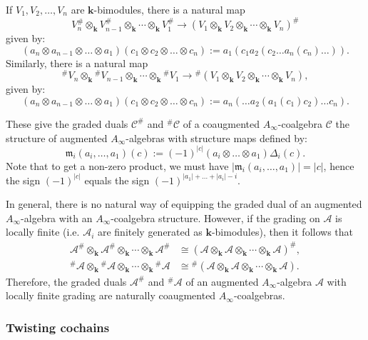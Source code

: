 \documentclass{gtpart}
\renewcommand{\k}{\mathbf{k}}
\newcommand{\m}{\mathfrak{m}}
\newcommand{\A}{\mathscr{A}}
\renewcommand{\C}{\mathscr{C}}
\begin{document}
If $V_1,V_2,\ldots, V_n$ are $\k$-bimodules, there is a natural map 
\[V_n^\# \otimes_\k  V_{n-1}^\# \otimes_\k \cdots \otimes_\k V_1^\# \to (V_1 \otimes_\k V_2 \otimes_\k \cdots \otimes_\k V_n)^\# \]
given  by:
\begin{equation}\label{composition} 
(a_n \otimes a_{n-1} \otimes \ldots \otimes a_1) (c_1 \otimes c_2 \otimes \ldots\otimes c_n ) :=
    a_1(c_1 a_2(c_2 \ldots a_n(c_n) \ldots)).  
\end{equation}
Similarly, there is a natural map 
\[^\# V_n \otimes_\k\!^\# V_{n-1} \otimes_\k \cdots \otimes_\k \!^\# V_1 \to \!^\#(V_1 \otimes_\k V_2
\otimes_\k \cdots \otimes_\k V_n), \]
given  by:
\begin{equation}\label{composition2} 
    (a_n \otimes a_{n-1} \otimes \ldots \otimes a_1) (c_1 \otimes c_2 \otimes \ldots\otimes c_n ) := a_n (\ldots a_2(a_1(c_1)c_2)\ldots c_n).  
\end{equation}

These give the graded duals $\C^\#$ and $\!^\#\C$ of a coaugmented $A_\infty$-coalgebra $\C$ the structure of augmented $A_\infty$-algebras with structure maps defined by:
\begin{equation}\label{dualainf} \m_i(a_i,\ldots,a_1) (c) := (-1)^{|c|} (a_i \otimes \ldots \otimes a_1)
\Delta_i (c). \end{equation}
Note that to get a non-zero product, we must have $|\m_i(a_i,\ldots,a_1)|=|c|$, hence the sign $(-1)^{|c|}$ equals the sign $(-1)^{|a_1|+\ldots+|a_i|-i}$.

In general, there is no natural way of equipping the graded dual of an augmented $A_\infty$-algebra with an $A_\infty$-coalgebra structure. However, if the grading on $\A$ is locally finite (i.e.
$\A_i$ are finitely generated as $\k$-bimodules), then it follows that
\begin{align*}
    \A^\# \otimes_{\k} \A^\# \otimes_\k \cdots \otimes_\k \A^{\#} &\cong (\A         \otimes_\k \A
    \otimes_\k
\cdots \otimes_\k \A)^\#, \\
    \!^\#\A\! \otimes_{\k} \!^\#\!\A \otimes_\k \cdots \otimes_\k \!^{\#}\!\A &\cong \!^\# (\A         \otimes_\k \A \otimes_\k \cdots \otimes_\k \A).
\end{align*}  Therefore, the graded duals $\A^\#$ and $^\#\!\A$ of an augmented
        $A_\infty$-algebra $\A$ with locally finite grading are naturally coaugmented $A_\infty$-coalgebras. 

\subsubsection{Twisting cochains}
\label{twisting} 
\end{document}

